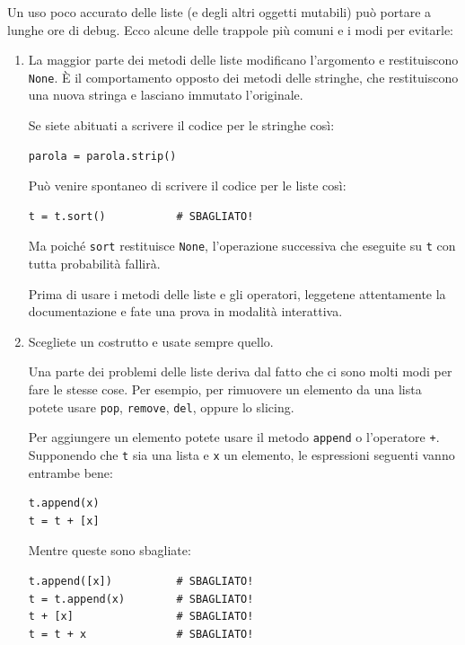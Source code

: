 \documentclass[10pt]{book}
\begin{document}
Un uso poco accurato delle liste (e degli altri oggetti mutabili) può portare a lunghe ore di debug. Ecco alcune delle trappole più comuni e i modi per evitarle:

\begin{enumerate}

\item La maggior parte dei metodi delle liste modificano l'argomento e restituiscono {\tt None}.  È il comportamento opposto dei metodi delle stringhe, che restituiscono una nuova stringa e lasciano immutato l'originale.

Se siete abituati a scrivere il codice per le stringhe così:

\begin{verbatim}
parola = parola.strip()
\end{verbatim}

Può venire spontaneo di scrivere il codice per le liste così:

\begin{verbatim}
t = t.sort()           # SBAGLIATO!
\end{verbatim}

Ma poiché {\tt sort} restituisce {\tt None}, l'operazione successiva che eseguite su {\tt t} con tutta probabilità fallirà.

Prima di usare i metodi delle liste e gli operatori, leggetene attentamente la documentazione e fate una prova in modalità interattiva.


\item Scegliete un costrutto e usate sempre quello.

Una parte dei problemi delle liste deriva dal fatto che ci sono molti modi per fare le stesse cose. Per esempio, per rimuovere un elemento da una lista potete usare {\tt pop}, {\tt remove}, {\tt del}, oppure lo slicing.

Per aggiungere un elemento potete usare il metodo {\tt append} o l'operatore {\tt +}. Supponendo che {\tt t} sia una lista e {\tt x} un elemento, le espressioni seguenti vanno entrambe bene:

\begin{verbatim}
t.append(x)
t = t + [x]
\end{verbatim}

Mentre queste sono sbagliate:

\begin{verbatim}
t.append([x])          # SBAGLIATO!
t = t.append(x)        # SBAGLIATO!
t + [x]                # SBAGLIATO!
t = t + x              # SBAGLIATO!
\end{verbatim}


\end{enumerate}
\end{document}
